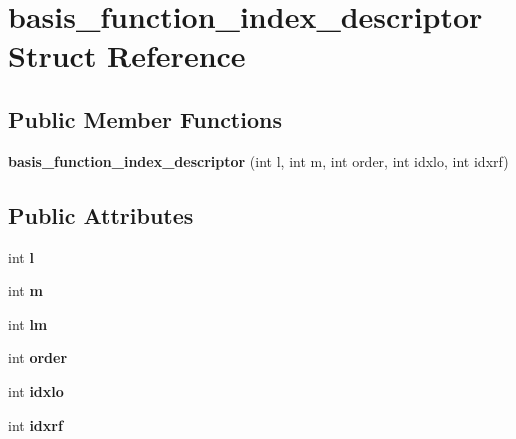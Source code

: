 \hypertarget{structbasis__function__index__descriptor}{}\section{basis\+\_\+function\+\_\+index\+\_\+descriptor Struct Reference}
\label{structbasis__function__index__descriptor}
\subsection*{Public Member Functions}
\begin{DoxyCompactItemize}
\item 
\hypertarget{structbasis__function__index__descriptor_a20b35d92e327f9fc8335447b7c20a1a7}{}{\bfseries basis\+\_\+function\+\_\+index\+\_\+descriptor} (int l, int m, int order, int idxlo, int idxrf)\label{structbasis__function__index__descriptor_a20b35d92e327f9fc8335447b7c20a1a7}

\end{DoxyCompactItemize}
\subsection*{Public Attributes}
\begin{DoxyCompactItemize}
\item 
\hypertarget{structbasis__function__index__descriptor_abada2598f1ba7af0b47d31773046a913}{}int {\bfseries l}\label{structbasis__function__index__descriptor_abada2598f1ba7af0b47d31773046a913}

\item 
\hypertarget{structbasis__function__index__descriptor_abea3c78611bf67ece95955e01c7921ce}{}int {\bfseries m}\label{structbasis__function__index__descriptor_abea3c78611bf67ece95955e01c7921ce}

\item 
\hypertarget{structbasis__function__index__descriptor_af588d0ba6f9a3c7e28450975aee03778}{}int {\bfseries lm}\label{structbasis__function__index__descriptor_af588d0ba6f9a3c7e28450975aee03778}

\item 
\hypertarget{structbasis__function__index__descriptor_a31bed308368b6fb2b82eda7e0bc301b6}{}int {\bfseries order}\label{structbasis__function__index__descriptor_a31bed308368b6fb2b82eda7e0bc301b6}

\item 
\hypertarget{structbasis__function__index__descriptor_a5a78b69d55e41dd3ae3bb456f11ca720}{}int {\bfseries idxlo}\label{structbasis__function__index__descriptor_a5a78b69d55e41dd3ae3bb456f11ca720}

\item 
\hypertarget{structbasis__function__index__descriptor_ab7398e9b6cacbb5d19d458d03dbda5b0}{}int {\bfseries idxrf}\label{structbasis__function__index__descriptor_ab7398e9b6cacbb5d19d458d03dbda5b0}

\end{DoxyCompactItemize}


